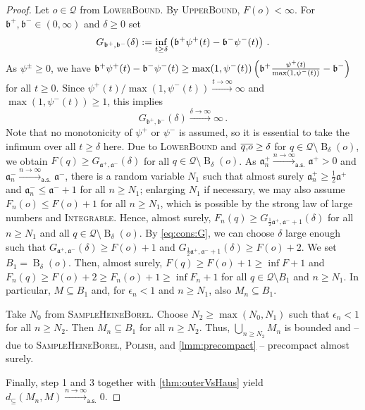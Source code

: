 \documentclass{scrartcl}
\renewcommand{\subset}{\subseteq}
\DeclareMathOperator{\ball}{\mathrm{B}}
\newcommand*{\mc}[1]{\mathcal{#1}}
\newcommand*{\ms}[1]{\mathsf{#1}}
\newcommand*{\mf}[1]{\mathfrak{#1}}
\newcommand{\equationFullstop}{\, .}
\newcommand{\eqfs}{\equationFullstop}
\theoremstyle{plain}\newtheorem{theorem}{Theorem}[section]
\theoremstyle{definition}
\theoremstyle{remark}
\begin{document}
\begin{proof}
Let $o\in\mc Q$ from \textsc{LowerBound}. By \textsc{UpperBound}, $F(o) < \infty$. For $\mf b^+, \mf b^- \in(0,\infty)$ and $\delta \geq 0$ set
\begin{equation*}
	G_{\mf b^+, \mf b^-}(\delta)
	:=
	\inf_{t \geq \delta} \br{\mf b^+ \psi^+(t) - \mf b^- \psi^-(t)}
	\eqfs
\end{equation*}
As $\psi^\pm \geq 0$, we have $\mf b^+ \psi^+(t) - \mf b^- \psi^-(t) \geq \max(1,\psi^-(t)) \br{\mf b^+ \frac{\psi^+(t)}{\max(1,\psi^-(t))} - \mf b^-}$ for all $t\geq0$. Since $\psi^+(t)/\max(1, \psi^-(t))\xrightarrow{t\to\infty}\infty$ and $\max(1,\psi^-(t))\geq1$, this implies
\begin{equation}\label{eq:cons:G}
	G_{\mf b^+, \mf b^-}(\delta) \xrightarrow{\delta\to\infty} \infty
	\eqfs
\end{equation}
Note that no monotonicity of $\psi^+$ or $\psi^-$ is assumed, so it is essential to take the infimum over all $t \geq \delta$ here.
Due to \textsc{LowerBound} and $\overline{q,\!o} \geq \delta$ for $q \in \mc Q\setminus\ball_\delta(o)$, we obtain $F(q) \geq G_{\mf a^+, \mf a^-}(\delta)$ for all $q\in\mc Q\setminus \ball_\delta(o)$.
As $\mf a^+_n \xrightarrow{n\to\infty}_{\ms{a.s.}} \mf a^+ > 0$ and $\mf a^-_n \xrightarrow{n\to\infty}_{\ms{a.s.}} \mf a^-$, there is a random variable $N_1$ such that almost surely $\mf a^+_n \geq \frac12 \mf a^+$ and $\mf a^-_n \leq \mf a^- +1$ for all $n\geq N_1$; enlarging $N_1$ if necessary, we may also assume $F_n(o) \leq F(o) + 1$ for all $n \geq N_1$, which is possible by the strong law of large numbers and \textsc{Integrable}. Hence, almost surely, $F_n(q) \geq G_{\frac12\mf a^+, \mf a^-+1}(\delta)$ for all $n\geq N_1$ and all $q\in\mc Q\setminus \ball_\delta(o)$.
By \eqref{eq:cons:G}, we can choose $\delta$ large enough such that $G_{\mf a^+, \mf a^-}(\delta) \geq F(o) + 1$ and $G_{\frac12\mf a^+, \mf a^-+1}(\delta) \geq F(o) + 2$. We set $B_1 = \ball_\delta(o)$.
Then, almost surely, $F(q) \geq F(o) + 1 \geq \inf F + 1$ and $F_n(q) \geq F(o)+2 \geq F_n(o) + 1 \geq \inf F_n + 1$ for all $q\in \mc Q \setminus B_1$ and $n \geq N_1$. In particular, $M \subset B_1$ and, for $\epsilon_n < 1$ and $n\geq N_1$, also $M_n \subset B_1$.

\noindent
\underline{}
Take $N_0$ from \textsc{SampleHeineBorel}. Choose $N_2\geq \max(N_0, N_1)$ such that $\epsilon_n < 1$ for all $n \geq N_2$. Then $M_n \subset B_1$ for all $n\geq N_2$. Thus, $\bigcup_{n\geq N_2}M_n$ is bounded and -- due to \textsc{SampleHeineBorel}, \textsc{Polish}, and \autoref{lmm:precompact} -- precompact almost surely. 

\noindent
\underline{}
Finally, step 1 and 3 together with \autoref{thm:outerVsHaus} yield $d_\subset(M_n, M) \xrightarrow{n\to\infty}_{\ms{a.s.}} 0$.
\end{proof}
\end{document}
